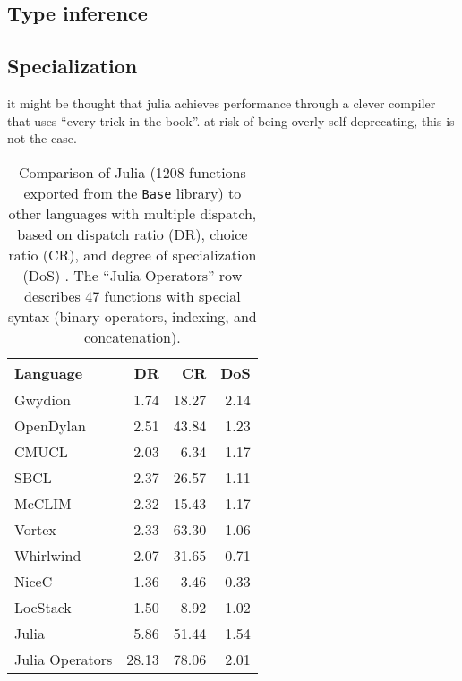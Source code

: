 \subsection{Type inference}

\subsection{Specialization}



it might be thought that julia achieves performance through a clever
compiler that uses ``every trick in the book''.
at risk of being overly self-deprecating, this is not the case.


\begin{table}
\begin{center}
\begin{tabular}{|l|r|r|r|}\hline
\textbf{Language} & \textbf{DR} & \textbf{CR} & \textbf{DoS} \\
\hline \hline
Gwydion    & 1.74 & 18.27 & 2.14 \\
\hline
OpenDylan  & 2.51 & 43.84 & 1.23 \\
\hline
CMUCL      & 2.03 &  6.34 & 1.17 \\
\hline
SBCL       & 2.37 & 26.57 & 1.11 \\
\hline
McCLIM     & 2.32 & 15.43 & 1.17 \\
\hline
Vortex     & 2.33 & 63.30 & 1.06 \\
\hline
Whirlwind  & 2.07 & 31.65 & 0.71 \\
\hline
NiceC      & 1.36 &  3.46 & 0.33 \\
\hline
LocStack   & 1.50 &  8.92 & 1.02 \\
\hline
Julia      & 5.86 & 51.44 & 1.54 \\
\hline
Julia Operators & 28.13 & 78.06 & 2.01 \\
\hline
\end{tabular}
\end{center}
\caption[Multiple dispatch use statistics]{
\small{
Comparison of Julia (1208 functions exported from the \texttt{Base} library)
to other languages with multiple dispatch, based on dispatch ratio (DR),
choice ratio (CR), and degree of specialization (DoS) \cite{multipledispatch}.
The ``Julia Operators'' row describes 47 functions with special syntax
(binary operators, indexing, and concatenation).
}
}
\label{dispatchratios}
\end{table}
